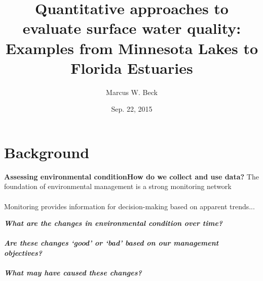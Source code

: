 \documentclass[serif]{beamer}\usepackage[]{graphicx}\usepackage[]{color}
\newcommand{\emtxt}[1]{\textbf{\textit{#1}}}
\begin{document}
\title[Evaluating water quality]{\textbf{Quantitative approaches to evaluate surface water quality: Examples from Minnesota Lakes to Florida Estuaries}}
\author[M. Beck]{Marcus W. Beck}


\date{Sep. 22, 2015}


\begin{frame}[shrink]
\titlepage
\end{frame}

\section{Background}

\begin{frame}{\textbf{Assessing environmental condition}}{\textbf{How do we collect and use data?}}
\onslide<+->
The foundation of environmental management is a strong monitoring network \scriptsize \cite{NRC90}\\~\\
\normalsize
Monitoring provides information for decision-making based on apparent trends...
\vspace{0.2in}
\begin{center}
\emtxt{What are the changes in environmental condition over time?}\\~\\
\emtxt{Are these changes `good' or `bad' based on our management objectives?}\\~\\
\emtxt{What may have caused these changes?}
\end{center}
\end{frame}
\end{document}
